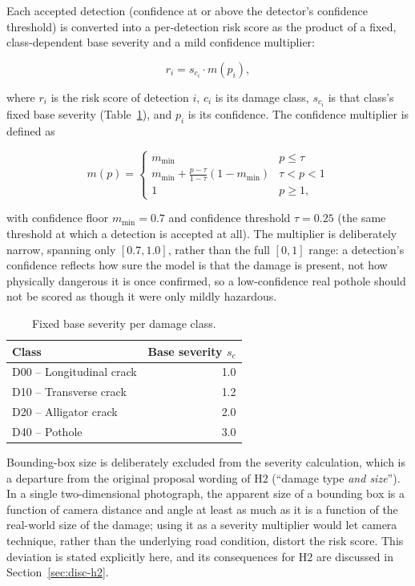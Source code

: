 \documentclass[10pt,a4paper,twocolumn]{article}
\begin{document}
Each accepted detection (confidence at or above the detector's
confidence threshold) is converted into a per-detection risk score as
the product of a fixed, class-dependent base severity and a mild
confidence multiplier:

\begin{equation}
  \label{eq:detection-risk}
  r_i = s_{c_i} \cdot m(p_i),
\end{equation}

where $r_i$ is the risk score of detection $i$, $c_i$ is its damage
class, $s_{c_i}$ is that class's fixed base severity
(Table~\ref{tab:severity}), and $p_i$ is its confidence. The confidence
multiplier is defined as

{\footnotesize
\begin{equation}
  \label{eq:confidence-multiplier}
  m(p) =
  \begin{cases}
    m_{\min} & p \leq \tau \\
    m_{\min} + \tfrac{p - \tau}{1 - \tau}(1 - m_{\min}) & \tau < p < 1 \\
    1 & p \geq 1,
  \end{cases}
\end{equation}
}

with confidence floor $m_{\min} = 0.7$ and confidence threshold
$\tau = 0.25$ (the same threshold at which a detection is accepted at
all). The multiplier is deliberately narrow, spanning only $[0.7, 1.0]$,
rather than the full $[0,1]$ range: a detection's confidence reflects how
sure the model is that the damage is present, not how physically
dangerous it is once confirmed, so a low-confidence real pothole should
not be scored as though it were only mildly hazardous.

\begin{table}[t]
  \centering
  \small
  \caption{Fixed base severity per damage class.}
  \label{tab:severity}
  \begin{tabular}{lr}
    \toprule
    Class & Base severity $s_c$ \\
    \midrule
    D00 -- Longitudinal crack & 1.0 \\
    D10 -- Transverse crack   & 1.2 \\
    D20 -- Alligator crack    & 2.0 \\
    D40 -- Pothole            & 3.0 \\
    \bottomrule
  \end{tabular}
\end{table}

Bounding-box size is deliberately excluded from the severity
calculation, which is a departure from the original proposal wording of
H2 (``damage type \emph{and size}''). In a single two-dimensional
photograph, the apparent size of a bounding box is a function of camera
distance and angle at least as much as it is a function of the real-world
size of the damage; using it as a severity multiplier would let camera
technique, rather than the underlying road condition, distort the risk
score. This deviation is stated explicitly here, and its consequences for
H2 are discussed in Section~\ref{sec:disc-h2}.
\end{document}
